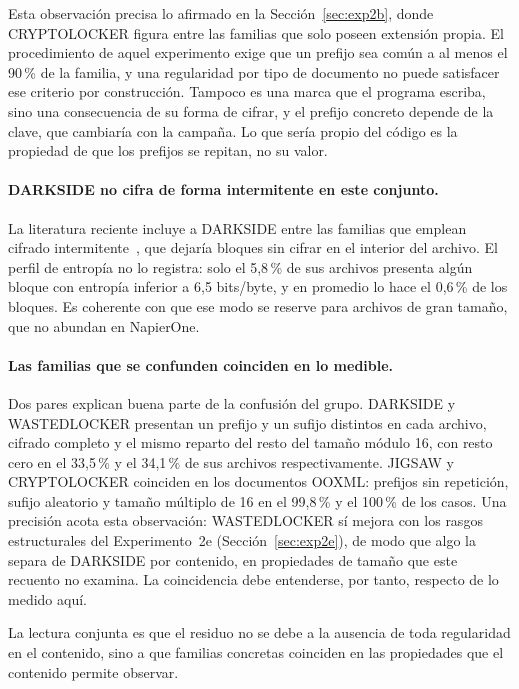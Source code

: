 Esta observación precisa lo afirmado en la Sección~\ref{sec:exp2b}, donde CRYPTOLOCKER figura entre las familias que solo poseen extensión propia. El procedimiento de aquel experimento exige que un prefijo sea común a al menos el 90\,\% de la familia, y una regularidad por tipo de documento no puede satisfacer ese criterio por construcción. Tampoco es una marca que el programa escriba, sino una consecuencia de su forma de cifrar, y el prefijo concreto depende de la clave, que cambiaría con la campaña. Lo que sería propio del código es la propiedad de que los prefijos se repitan, no su valor.

\paragraph{DARKSIDE no cifra de forma intermitente en este conjunto.} La literatura reciente incluye a DARKSIDE entre las familias que emplean cifrado intermitente~\cite{ineza2025intermittent}, que dejaría bloques sin cifrar en el interior del archivo. El perfil de entropía no lo registra: solo el 5,8\,\% de sus archivos presenta algún bloque con entropía inferior a 6,5 bits/byte, y en promedio lo hace el 0,6\,\% de los bloques. Es coherente con que ese modo se reserve para archivos de gran tamaño, que no abundan en NapierOne.

\paragraph{Las familias que se confunden coinciden en lo medible.} Dos pares explican buena parte de la confusión del grupo. DARKSIDE y WASTEDLOCKER presentan un prefijo y un sufijo distintos en cada archivo, cifrado completo y el mismo reparto del resto del tamaño módulo 16, con resto cero en el 33,5\,\% y el 34,1\,\% de sus archivos respectivamente. JIGSAW y CRYPTOLOCKER coinciden en los documentos OOXML: prefijos sin repetición, sufijo aleatorio y tamaño múltiplo de 16 en el 99,8\,\% y el 100\,\% de los casos. Una precisión acota esta observación: WASTEDLOCKER sí mejora con los rasgos estructurales del Experimento~2e (Sección~\ref{sec:exp2e}), de modo que algo la separa de DARKSIDE por contenido, en propiedades de tamaño que este recuento no examina. La coincidencia debe entenderse, por tanto, respecto de lo medido aquí.

La lectura conjunta es que el residuo no se debe a la ausencia de toda regularidad en el contenido, sino a que familias concretas coinciden en las propiedades que el contenido permite observar.


